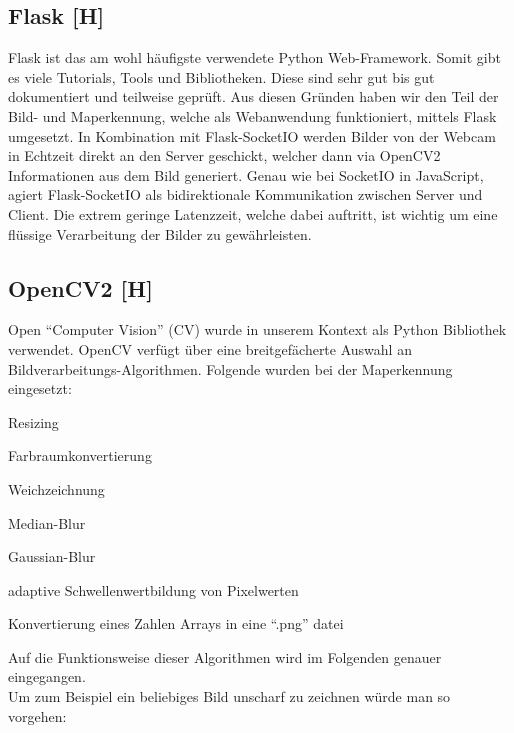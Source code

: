 \subsection{Flask [H]}
Flask ist das am wohl häufigste verwendete Python Web-Framework. Somit gibt es viele Tutorials,
Tools und Bibliotheken. Diese sind sehr gut bis gut dokumentiert und teilweise geprüft.
Aus diesen Gründen haben wir den Teil der Bild- und Maperkennung, welche
als Webanwendung funktioniert, mittels Flask umgesetzt. In Kombination mit Flask-SocketIO werden Bilder von der Webcam
in Echtzeit direkt an den Server geschickt, welcher dann via OpenCV2 Informationen aus dem Bild
generiert. Genau wie bei SocketIO in JavaScript, agiert Flask-SocketIO als bidirektionale
Kommunikation zwischen Server und Client. Die extrem geringe Latenzzeit, welche dabei auftritt,
ist wichtig um eine flüssige Verarbeitung der Bilder zu gewährleisten.

\subsection{OpenCV2 [H]}
Open ``Computer Vision'' (CV) wurde in unserem Kontext als Python Bibliothek verwendet. OpenCV verfügt über eine
breitgefächerte Auswahl an Bildverarbeitungs-Algorithmen.
Folgende wurden bei der Maperkennung eingesetzt:
\begin{compactitem}
    \item Resizing
    \item Farbraumkonvertierung
    \item Weichzeichnung
    \begin{compactitem}
        \item Median-Blur
        \item Gaussian-Blur
    \end{compactitem}
    \item adaptive Schwellenwertbildung von Pixelwerten
    \item Konvertierung eines Zahlen Arrays in eine ``.png'' datei
\end{compactitem}
Auf die Funktionsweise dieser Algorithmen wird im Folgenden genauer eingegangen.
\\
Um zum Beispiel ein beliebiges Bild unscharf zu zeichnen würde man so vorgehen:
\\

